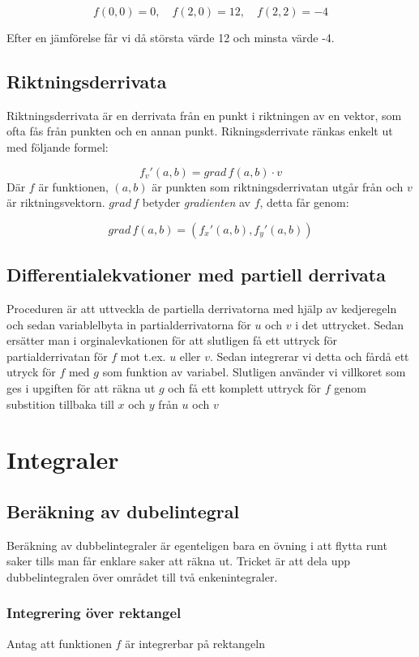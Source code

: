 \documentclass[12pt]{article} %
\begin{document}
\[
    f(0,0) = 0, \quad f(2,0) = 12, \quad f(2,2) = -4
\]

Efter en jämförelse får vi då största värde 12 och minsta värde -4.

\subsection{Riktningsderrivata}

Riktningsderrivata är en derrivata från en punkt i riktningen av en vektor, som ofta fås från punkten och en annan punkt.
Rikningsderrivate ränkas enkelt ut med följande formel:

\[
    f_{v}' (a,b) = grad\, f(a,b) \cdot v
\]
Där $f$ är funktionen, $(a,b)$ är punkten som riktningsderrivatan utgår från och $v$ är riktningsvektorn. $grad\, f$ betyder \textit{gradienten} av $f$, detta får genom:

\[
    grad\, f(a,b) = (f_{x}'(a,b), f_{y}'(a,b))
\]


\subsection{Differentialekvationer med partiell derrivata}

Proceduren är att uttveckla de partiella derrivatorna med hjälp av kedjeregeln och sedan variablelbyta in partialderrivatorna för $u$ och $v$ i det uttrycket. Sedan ersätter man i orginalevkationen för att slutligen få ett uttryck för partialderrivatan för $f$ mot t.ex. $u$ eller $v$. Sedan integrerar vi detta och fårdå ett utryck för $f$ med $g$ som funktion av variabel. Slutligen använder vi villkoret som ges i upgiften för att räkna ut $g$ och få ett komplett uttryck för $f$ genom substition tillbaka till $x$ och $y$ från $u$ och $v$

\section{Integraler} %

\subsection{Beräkning av dubelintegral}

Beräkning av dubbelintegraler är egenteligen bara en övning i att flytta runt saker tills man får enklare saker att räkna ut. Tricket är att dela upp dubbelintegralen över området till två enkenintegraler. 

\subsubsection{Integrering över rektangel}
Antag att funktionen $f$ är integrerbar på rektangeln
\end{document}
